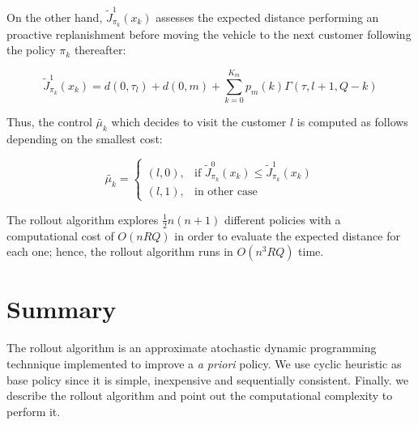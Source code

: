 On the other hand, $\tilde{J}^1_{\pi_k}(x_k)$ assesses the expected distance performing an proactive replanishment before moving the vehicle to the next customer following the policy ${\pi_k}$ thereafter:

\begin{equation}\label{ra:Cost2Go1}%
 \tilde{J}^1_{\pi_k}(x_k)=d(0,\tau_l)+d(0,m)+\sum_{k=0}^{K_m}p_m(k)\Gamma(\tau,l+1,Q-k)
\end{equation}

Thus, the control $\tilde{\mu_k}$ which decides to visit the customer $l$ is computed as follows depending on the smallest cost:

\begin{equation}\label{eq:costg}
    \tilde{\mu_k} = \left \{ \begin{array}{ll}
    (l,0), & \text{if } \tilde{J}^0_{\pi_k}(x_k) \leq \tilde{J}^1_{\pi_k}(x_k)\\
    (l,1), & \text{in other case}
    \end{array} \right.
 \end{equation}



The rollout algorithm explores $\frac{1}{2}n(n+1)$ different policies with a computational cost of $O(nRQ)$ in order to evaluate the expected distance for each one; hence, the rollout algorithm runs in $O(n^3RQ)$ time.


\section{Summary}

The rollout algorithm is an approximate atochastic dynamic programming technnique implemented to improve a \textit{a priori} policy. We use cyclic heuristic as base policy since it is simple, inexpensive and sequentially consistent. Finally. we describe the rollout algorithm and point out the computational complexity to perform it.





